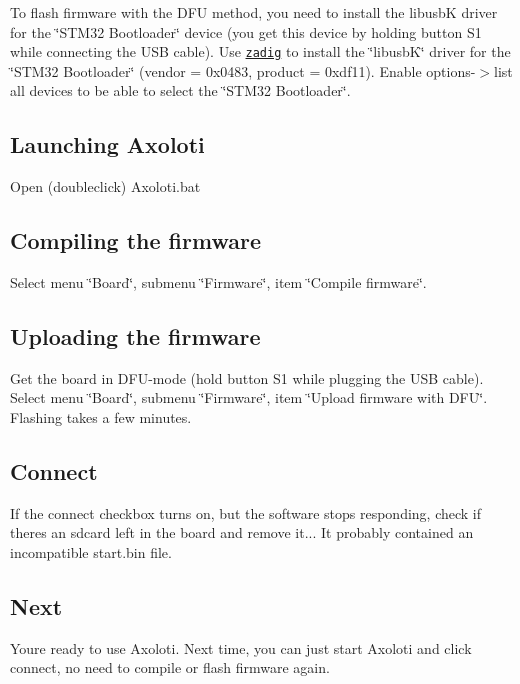 To flash firmware with the D\+FU method, you need to install the libusbK driver for the \char`\"{}\+S\+T\+M32 Bootloader\char`\"{} device (you get this device by holding button S1 while connecting the U\+SB cable). Use \href{http://zadig.akeo.ie/}{\tt zadig} to install the \char`\"{}libusb\+K\char`\"{} driver for the \char`\"{}\+S\+T\+M32 Bootloader\char`\"{} (vendor = 0x0483, product = 0xdf11). Enable options-\/$>$list all devices to be able to select the \char`\"{}\+S\+T\+M32 Bootloader\char`\"{}. \subsection*{Launching Axoloti}

Open (doubleclick) Axoloti.\+bat \subsection*{Compiling the firmware}

Select menu \char`\"{}\+Board\char`\"{}, submenu \char`\"{}\+Firmware\char`\"{}, item \char`\"{}\+Compile firmware\char`\"{}. \subsection*{Uploading the firmware}

Get the board in D\+F\+U-\/mode (hold button S1 while plugging the U\+SB cable). Select menu \char`\"{}\+Board\char`\"{}, submenu \char`\"{}\+Firmware\char`\"{}, item \char`\"{}\+Upload firmware with D\+F\+U\char`\"{}. Flashing takes a few minutes. \subsection*{Connect}

If the connect checkbox turns on, but the software stops responding, check if there\textquotesingle{}s an sdcard left in the board and remove it... It probably contained an incompatible start.\+bin file. \subsection*{Next}

You\textquotesingle{}re ready to use Axoloti. Next time, you can just start Axoloti and click connect, no need to compile or flash firmware again. 
